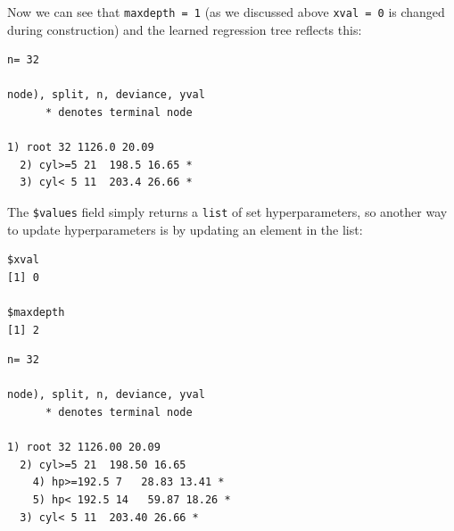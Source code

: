 Now we can see that \texttt{maxdepth\ =\ 1} (as we discussed above
\texttt{xval\ =\ 0} is changed during construction) and the learned
regression tree reflects this:

\begin{Shaded}
\begin{Highlighting}[]
\SpecialCharTok{$}\NormalTok{(}\NormalTok{(}\NormalTok{))}\SpecialCharTok{$}
\end{Highlighting}
\end{Shaded}

\begin{verbatim}
n= 32 

node), split, n, deviance, yval
      * denotes terminal node

1) root 32 1126.0 20.09  
  2) cyl>=5 21  198.5 16.65 *
  3) cyl< 5 11  203.4 26.66 *
\end{verbatim}

The \texttt{\$values} field simply returns a \texttt{list} of set
hyperparameters, so another way to update hyperparameters is by updating
an element in the list:

\begin{Shaded}
\begin{Highlighting}[]
\SpecialCharTok{$}\SpecialCharTok{$}\SpecialCharTok{$}\OtherTok{=} 
\SpecialCharTok{$}\SpecialCharTok{$}
\end{Highlighting}
\end{Shaded}

\begin{verbatim}
$xval
[1] 0

$maxdepth
[1] 2
\end{verbatim}

\begin{Shaded}
\begin{Highlighting}[]
\SpecialCharTok{$}\NormalTok{(}\NormalTok{(}\NormalTok{))}\SpecialCharTok{$}
\end{Highlighting}
\end{Shaded}

\begin{verbatim}
n= 32 

node), split, n, deviance, yval
      * denotes terminal node

1) root 32 1126.00 20.09  
  2) cyl>=5 21  198.50 16.65  
    4) hp>=192.5 7   28.83 13.41 *
    5) hp< 192.5 14   59.87 18.26 *
  3) cyl< 5 11  203.40 26.66 *
\end{verbatim}

